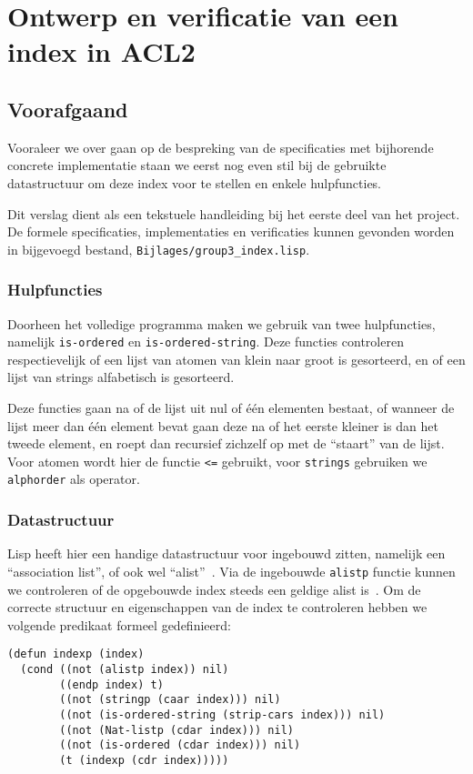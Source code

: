 \chapter{Ontwerp en verificatie van een index in ACL2}
\section{Voorafgaand}
Vooraleer we over gaan op de bespreking van de specificaties met bijhorende concrete implementatie staan we eerst nog even stil bij de gebruikte datastructuur om deze index voor te stellen en enkele hulpfuncties. 

Dit verslag dient als een tekstuele handleiding bij het eerste deel van het project. De formele specificaties, implementaties en verificaties kunnen gevonden worden in bijgevoegd bestand, \texttt{Bijlages/group3\_index.lisp}.

\subsection{Hulpfuncties}
Doorheen het volledige programma maken we gebruik van twee hulpfuncties, namelijk \texttt{is-ordered} en \texttt{is-ordered-string}. Deze functies controleren respectievelijk of een lijst van atomen van klein naar groot is gesorteerd, en of een lijst van strings alfabetisch is gesorteerd.

Deze functies gaan na of de lijst uit nul of één elementen bestaat, of wanneer de lijst meer dan één element bevat gaan deze na of het eerste kleiner is dan het tweede element, en roept dan recursief zichzelf op met de ``staart'' van de lijst. Voor atomen wordt hier de functie \texttt{<=} gebruikt, voor \texttt{strings} gebruiken we \texttt{alphorder} als operator.

\subsection{Datastructuur}
\label{datastructuur}
Lisp heeft hier een handige datastructuur voor ingebouwd zitten, namelijk een ``association list'', of ook wel ``alist''~\cite{alist}. Via de ingebouwde \texttt{alistp} functie kunnen we controleren of de opgebouwde index steeds een geldige alist is~\cite{ALIST6:online}. Om de correcte structuur en eigenschappen van de index te controleren hebben we volgende predikaat formeel gedefinieerd:
\begin{lstlisting}
(defun indexp (index)
  (cond ((not (alistp index)) nil)
        ((endp index) t)
        ((not (stringp (caar index))) nil)
        ((not (is-ordered-string (strip-cars index))) nil)
        ((not (Nat-listp (cdar index))) nil)
        ((not (is-ordered (cdar index))) nil)
        (t (indexp (cdr index)))))
\end{lstlisting}


